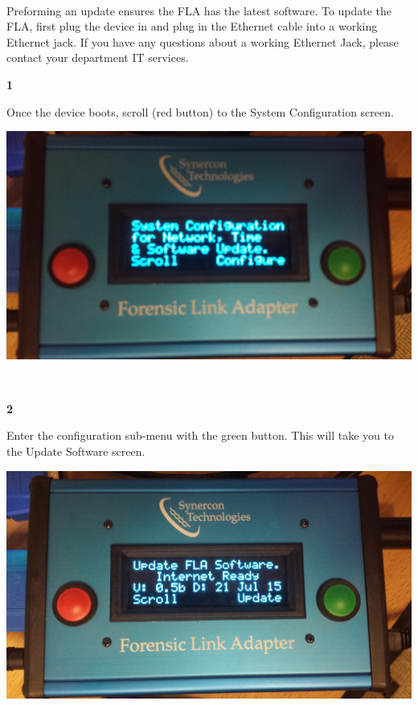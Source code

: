 \documentclass[11pt]{article}
\begin{document}
\paragraph{  }
Preforming an update ensures the FLA has the latest software. To update the FLA, first plug the device in and plug in the Ethernet cable into a working Ethernet jack. If you have any questions about a working Ethernet Jack, please contact your department IT services.
\\[\baselineskip]
\noindent\begin{minipage}{0.3\textwidth}%
\begin{center}
\textbf{1}\\[\baselineskip]
\end{center}
Once the device boots, scroll (red button) to the System Configuration screen.
\end{minipage}%
\hfill%
\begin{minipage}{0.6\textwidth}
\includegraphics[width=\linewidth]{../media/fla_screens/sys_conf}
\end{minipage}
\\[\baselineskip]
\noindent\begin{minipage}{0.3\textwidth}%
\begin{center}
\textbf{2}\\[\baselineskip]
\end{center}
Enter the configuration sub-menu with the green button. This will take you to the Update Software screen.
\end{minipage}%
\hfill%
\begin{minipage}{0.6\textwidth}
\includegraphics[width=\linewidth]{../media/fla_screens/update_ready}
\end{minipage}
\end{document}
